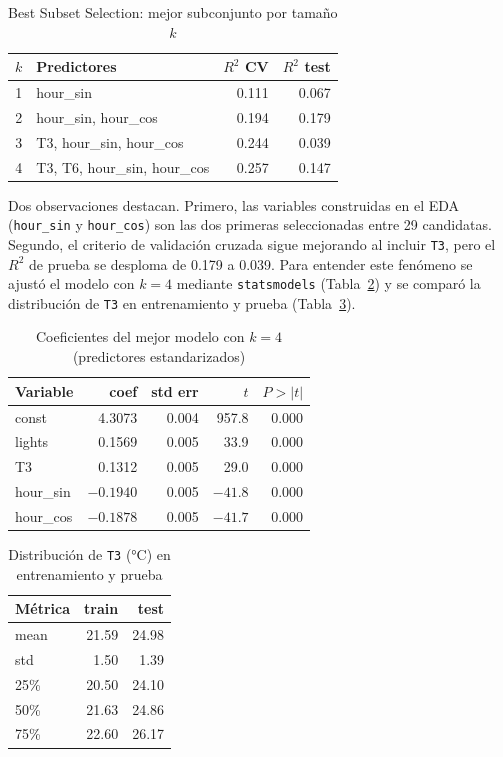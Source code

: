 \documentclass[11pt,a4paper]{article}
\begin{document}
\begin{table}[H]
  \centering
  \caption{Best Subset Selection: mejor subconjunto por tamaño $k$}
  \label{tab:bestsubset}
  \begin{tabular}{clrr}
    \toprule
    $k$ & Predictores & $R^2$ CV & $R^2$ test \\
    \midrule
    1 & hour\_sin & 0.111 & 0.067 \\
    2 & hour\_sin, hour\_cos & 0.194 & 0.179 \\
    3 & T3, hour\_sin, hour\_cos & 0.244 & 0.039 \\
    4 & T3, T6, hour\_sin, hour\_cos & 0.257 & 0.147 \\
    \bottomrule
  \end{tabular}
\end{table}

Dos observaciones destacan. Primero, las variables construidas en el EDA (\texttt{hour\_sin} y
\texttt{hour\_cos}) son las dos primeras seleccionadas entre 29 candidatas. Segundo, el criterio
de validación cruzada sigue mejorando al incluir \texttt{T3}, pero el $R^2$ de prueba se
desploma de 0.179 a 0.039. Para entender este fenómeno se ajustó el modelo con $k = 4$ mediante
\texttt{statsmodels} (Tabla~\ref{tab:ols4}) y se comparó la distribución de \texttt{T3} en
entrenamiento y prueba (Tabla~\ref{tab:t3}).

\begin{table}[H]
  \centering
  \caption{Coeficientes del mejor modelo con $k = 4$ (predictores estandarizados)}
  \label{tab:ols4}
  \begin{tabular}{lrrrr}
    \toprule
    Variable & coef & std err & $t$ & $P>|t|$ \\
    \midrule
    const & 4.3073 & 0.004 & 957.8 & 0.000 \\
    lights & 0.1569 & 0.005 & 33.9 & 0.000 \\
    T3 & 0.1312 & 0.005 & 29.0 & 0.000 \\
    hour\_sin & $-0.1940$ & 0.005 & $-41.8$ & 0.000 \\
    hour\_cos & $-0.1878$ & 0.005 & $-41.7$ & 0.000 \\
    \bottomrule
  \end{tabular}
\end{table}

\begin{table}[H]
  \centering
  \caption{Distribución de \texttt{T3} (°C) en entrenamiento y prueba}
  \label{tab:t3}
  \begin{tabular}{lrr}
    \toprule
    Métrica & train & test \\
    \midrule
    mean & 21.59 & 24.98 \\
    std & 1.50 & 1.39 \\
    25\% & 20.50 & 24.10 \\
    50\% & 21.63 & 24.86 \\
    75\% & 22.60 & 26.17 \\
    \bottomrule
  \end{tabular}
\end{table}
\end{document}
